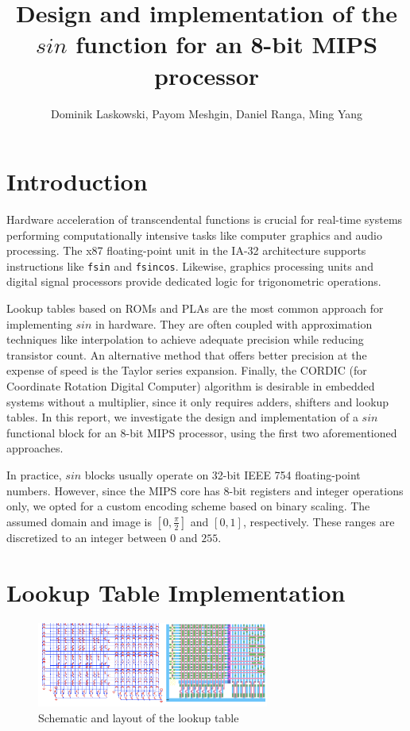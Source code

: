 \documentclass[10pt,journal]{IEEEtran}
\title{Design and implementation of the $sin$ function for an 8-bit MIPS processor}
\author{Dominik Laskowski, Payom Meshgin, Daniel Ranga, Ming Yang}
\begin{document}
\maketitle

\section{Introduction}
Hardware acceleration of transcendental functions is crucial for real-time systems
performing computationally intensive tasks like computer graphics and audio processing.
The x87 floating-point unit in the IA-32 architecture supports instructions like \texttt{fsin}
and \texttt{fsincos}. Likewise, graphics processing units and digital signal processors
provide dedicated logic for trigonometric operations.

Lookup tables based on ROMs and PLAs are the most common approach for implementing $sin$
in hardware. They are often coupled with approximation techniques like interpolation to
achieve adequate precision while reducing transistor count. An alternative method that
offers better precision at the expense of speed is the Taylor series expansion. Finally,
the CORDIC (for Coordinate Rotation Digital Computer) algorithm is desirable in embedded
systems without a multiplier, since it only requires adders, shifters and lookup tables.
In this report, we investigate the design and implementation of a $sin$ functional block for
an 8-bit MIPS processor, using the first two aforementioned approaches.

In practice, $sin$ blocks usually operate on 32-bit IEEE 754 floating-point numbers. However,
since the MIPS core has 8-bit registers and integer operations only, we opted for a custom encoding
scheme based on binary scaling. The assumed domain and image is $[0, \frac{\pi}{2}]$ and $[0, 1]$,
respectively. These ranges are discretized to an integer between $0$ and $255$.

\section{Lookup Table Implementation}

\begin{figure}[h]
\centering
\includegraphics[width=3in]{lut.png}
\caption{Schematic and layout of the lookup table}
\label{lut}
\end{figure}
\end{document}
